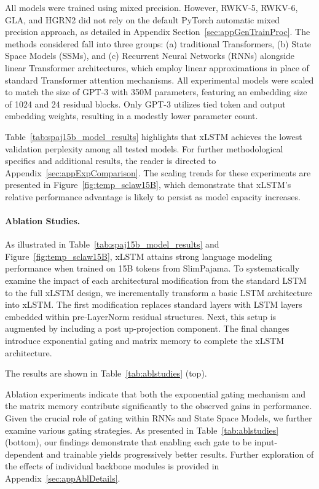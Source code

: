All models were trained using mixed precision. However, RWKV-5, RWKV-6, GLA, and HGRN2 did not rely on the default PyTorch automatic mixed precision approach, as detailed in Appendix Section~\ref{sec:appGenTrainProc}. The methods considered fall into three groups: (a) traditional Transformers, (b) State Space Models (SSMs), and (c) Recurrent Neural Networks (RNNs) alongside linear Transformer architectures, which employ linear approximations in place of standard Transformer attention mechanisms. All experimental models were scaled to match the size of GPT-3 with 350M parameters, featuring an embedding size of 1024 and 24 residual blocks. Only GPT-3 utilizes tied token and output embedding weights, resulting in a modestly lower parameter count.

Table~\ref{tab:spaj15b_model_results} highlights that xLSTM achieves the lowest validation perplexity among all tested models. For further methodological specifics and additional results, the reader is directed to Appendix~\ref{sec:appExpComparison}. The scaling trends for these experiments are presented in Figure~\ref{fig:temp_sclaw15B}, which demonstrate that xLSTM’s relative performance advantage is likely to persist as model capacity increases.

\paragraph{Ablation Studies.}
As illustrated in Table~\ref{tab:spaj15b_model_results} and Figure~\ref{fig:temp_sclaw15B}, xLSTM attains strong language modeling performance when trained on 15B tokens from SlimPajama. To systematically examine the impact of each architectural modification from the standard LSTM to the full xLSTM design, we incrementally transform a basic LSTM architecture into xLSTM. The first modification replaces standard layers with LSTM layers embedded within pre-LayerNorm residual structures. Next, this setup is augmented by including a post up-projection component. The final changes introduce exponential gating and matrix memory to complete the xLSTM architecture.

The results are shown in Table~\ref{tab:ablstudies} (top). 

Ablation experiments indicate that both the exponential gating mechanism and the matrix memory contribute significantly to the observed gains in performance. Given the crucial role of gating within RNNs and State Space Models, we further examine various gating strategies. As presented in Table~\ref{tab:ablstudies} (bottom), our findings demonstrate that enabling each gate to be input-dependent and trainable yields progressively better results. Further exploration of the effects of individual backbone modules is provided in Appendix~\ref{sec:appAblDetails}.

